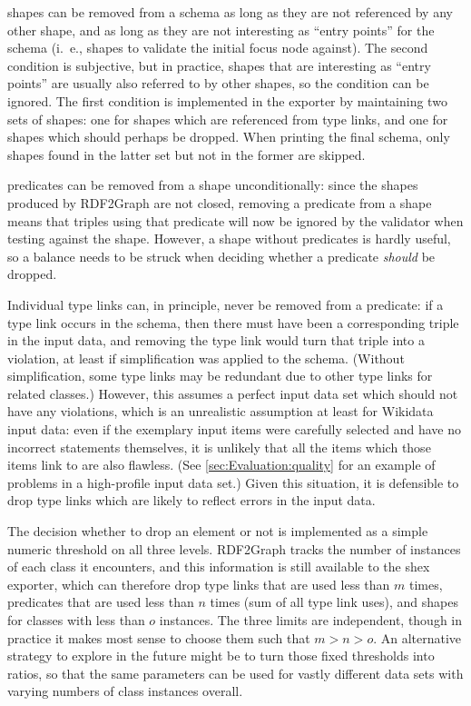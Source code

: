 \Glspl{shape} can be removed from a \gls{schema} as long as they are not referenced by any other shape,
and as long as they are not interesting as “entry points” for the \gls{schema}
(i.~e., \glspl{shape} to validate the initial \gls{focus node} against).
The second condition is subjective,
but in practice, \glspl{shape} that are interesting as “entry points”
are usually also referred to by other \glspl{shape},
so the condition can be ignored.
The first condition is implemented in the exporter
by maintaining two sets of \glspl{shape}:
one for \glspl{shape} which are referenced from \glspl{type link},
and one for \glspl{shape} which should perhaps be dropped.
When printing the final \gls{schema},
only \glspl{shape} found in the latter set but not in the former are skipped.

\Glspl{predicate} can be removed from a \gls{shape} unconditionally:
since the \glspl{shape} produced by \gls{RDF2Graph} are not closed,
removing a \gls{predicate} from a \gls{shape} means that \glspl{triple} using that \gls{predicate}
will now be ignored by the validator when testing against the \gls{shape}.
However, a \gls{shape} without \glspl{predicate} is hardly useful,
so a balance needs to be struck when deciding whether a \gls{predicate} \emph{should} be dropped.

Individual \glspl{type link} can, in principle, never be removed from a \gls{predicate}:
if a \gls{type link} occurs in the \gls{schema},
then there must have been a corresponding \gls{triple} in the input data,
and removing the \gls{type link} would turn that \gls{triple} into a violation,
at least if simplification was applied to the \gls{schema}.
(Without simplification, some \glspl{type link} may be redundant
due to other \glspl{type link} for related classes.)
However, this assumes a perfect input data set which should not have any violations,
which is an unrealistic assumption at least for \gls{Wikidata} input data:
even if the exemplary input \glspl{item} were carefully selected
and have no incorrect \glspl{statement} themselves,
it is unlikely that all the \glspl{item} which those \glspl{item} link to are also flawless.
(See \cref{sec:Evaluation:quality} for an example of problems in a high-profile input data set.)
Given this situation, it is defensible to drop \glspl{type link}
which are likely to reflect errors in the input data.

The decision whether to drop an element or not
is implemented as a simple numeric threshold on all three levels.
\Gls{RDF2Graph} tracks the number of instances of each class it encounters,
and this information is still available to the \gls{shex} exporter,
which can therefore drop \glspl{type link} that are used less than $m$ times,
\glspl{predicate} that are used less than $n$ times (sum of all \gls{type link} uses),
and \glspl{shape} for classes with less than $o$ instances.
The three limits are independent,
though in practice it makes most sense to choose them such that $m > n > o$.
An alternative strategy to explore in the future might be
to turn those fixed thresholds into ratios,
so that the same parameters can be used for vastly different data sets
with varying numbers of class instances overall.

